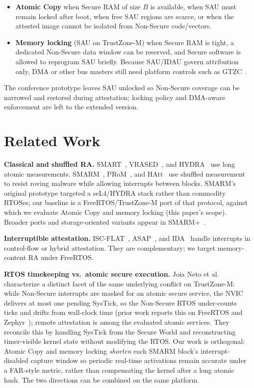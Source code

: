 \documentclass[conference]{IEEEtran}
\begin{document}
\begin{itemize}
  \item \textbf{Atomic Copy} when Secure RAM of size $B$ is available,
    when SAU must remain locked after boot, when free SAU regions are
    scarce, or when the attested image cannot be isolated from Non-Secure
    code/vectors.
  \item \textbf{Memory locking} (SAU on TrustZone-M) when Secure RAM is
    tight, a dedicated Non-Secure data window can be reserved, and Secure
    software is allowed to reprogram SAU briefly. Because SAU/IDAU govern
    attribution only, DMA or other bus masters still need platform
    controls such as GTZC~\cite{an5347}.
\end{itemize}
The conference prototype leaves SAU unlocked so Non-Secure coverage can
be narrowed and restored during attestation; locking policy and DMA-aware enforcement are left to the
extended version.

\section{Related Work}
\label{sec:related}

\textbf{Classical and shuffled RA.}
SMART~\cite{eldefrawy2012smart}, VRASED~\cite{nunes2019vrased}, and
HYDRA~\cite{eldefrawy2017hydra} use long atomic measurements.
SMARM~\cite{carpent2018smarm}, PRoM~\cite{aman2021prom}, and
HAtt~\cite{aman2018hatt} use shuffled measurement to resist roving
malware while allowing interrupts between blocks. SMARM's original
prototype targeted a seL4/HYDRA stack rather than commodity RTOSes; our
baseline is a FreeRTOS/TrustZone-M port of that protocol, against which
we evaluate Atomic Copy and memory locking (this paper's scope).
Broader ports and storage-oriented variants appear in SMARM+~\cite{smarmplus2026}.

\textbf{Interruptible attestation.}
ISC-FLAT~\cite{isc-flat}, ASAP~\cite{asap}, and IDA~\cite{ida2024}
handle interrupts in control-flow or hybrid attestation. They are
complementary; we target memory-content RA under FreeRTOS.

\textbf{RTOS timekeeping vs.\ atomic secure execution.}
Joia Neto et al.~\cite{joianeto2026timekeeping} characterize a
distinct facet of the same underlying conflict on TrustZone-M: while
Non-Secure interrupts are masked for an atomic secure service, the
NVIC delivers at most one pending SysTick, so the Non-Secure RTOS
under-counts ticks and drifts from wall-clock time (prior work reports
this on FreeRTOS and Zephyr~\cite{joianeto2026timekeeping}); remote
attestation is among the evaluated atomic services.
They reconcile this by handling SysTick from the Secure World and
reconstructing timer-visible kernel state without modifying the RTOS.
Our work is orthogonal: Atomic Copy and memory locking \emph{shorten}
each SMARM block's interrupt-disabled capture window so periodic
real-time activations remain accurate under a FAR-style metric, rather
than compensating the kernel after a long atomic hash.
The two directions can be combined on the same platform.
\end{document}
